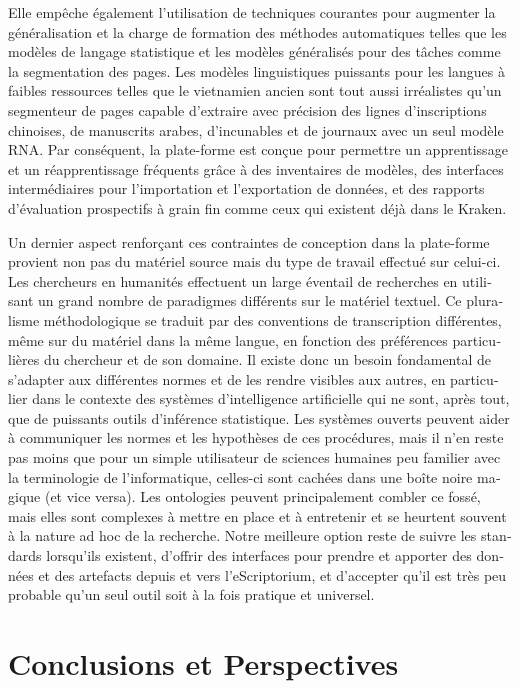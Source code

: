 \begin{french}
Elle empêche également l'utilisation de techniques courantes pour augmenter la
généralisation et la charge de formation des méthodes automatiques telles que
les modèles de langage statistique et les modèles généralisés pour des tâches
comme la segmentation des pages. Les modèles linguistiques puissants pour les
langues à faibles ressources telles que le vietnamien ancien sont tout aussi
irréalistes qu'un segmenteur de pages capable d'extraire avec précision des
lignes d'inscriptions chinoises, de manuscrits arabes, d'incunables et de
journaux avec un seul modèle RNA. Par conséquent, la plate-forme est conçue
pour permettre un apprentissage et un réapprentissage fréquents grâce à des
inventaires de modèles, des interfaces intermédiaires pour l'importation et
l'exportation de données, et des rapports d'évaluation prospectifs à grain fin
comme ceux qui existent déjà dans le Kraken.

Un dernier aspect renforçant ces contraintes de conception dans la plate-forme
provient non pas du matériel source mais du type de travail effectué sur
celui-ci. Les chercheurs en humanités effectuent un large éventail de
recherches en utilisant un grand nombre de paradigmes différents sur le
matériel textuel. Ce pluralisme méthodologique se traduit par des conventions
de transcription différentes, même sur du matériel dans la même langue, en
fonction des préférences particulières du chercheur et de son domaine. Il
existe donc un besoin fondamental de s'adapter aux différentes normes et de les
rendre visibles aux autres, en particulier dans le contexte des systèmes
d'intelligence artificielle qui ne sont, après tout, que de puissants outils
d'inférence statistique. Les systèmes ouverts peuvent aider à communiquer les
normes et les hypothèses de ces procédures, mais il n'en reste pas moins que
pour un simple utilisateur de sciences humaines peu familier avec la
terminologie de l'informatique, celles-ci sont cachées dans une boîte noire
magique (et vice versa).  Les ontologies peuvent principalement combler ce
fossé, mais elles sont complexes à mettre en place et à entretenir et se
heurtent souvent à la nature ad hoc de la recherche. Notre meilleure option
reste de suivre les standards lorsqu'ils existent, d'offrir des interfaces pour
prendre et apporter des données et des artefacts depuis et vers l'eScriptorium,
et d'accepter qu'il est très peu probable qu'un seul outil soit à la fois
pratique et universel.

\section{Conclusions et Perspectives}


\end{french}
